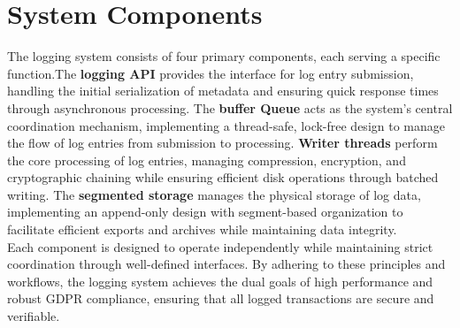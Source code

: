 \section{System Components}
The logging system consists of four primary components, each serving a specific function.The \textbf{logging API} provides the interface for log entry submission, handling the initial serialization of metadata and ensuring quick response times through asynchronous processing. The \textbf{buffer Queue} acts as the system's central coordination mechanism, implementing a thread-safe, lock-free design to manage the flow of log entries from submission to processing. \textbf{Writer threads} perform the core processing of log entries, managing compression, encryption, and cryptographic chaining while ensuring efficient disk operations through batched writing. The \textbf{segmented storage} manages the physical storage of log data, implementing an append-only design with segment-based organization to facilitate efficient exports and archives while maintaining data integrity.\\

\noindent
Each component is designed to operate independently while maintaining strict coordination through well-defined interfaces. By adhering to these principles and workflows, the logging system achieves the dual goals of high performance and robust GDPR compliance, ensuring that all logged transactions are secure and verifiable.